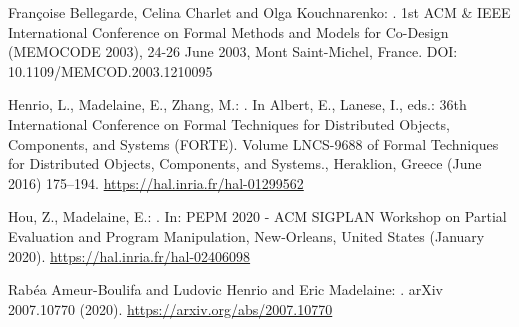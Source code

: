 \documentclass[11pt,fleqn]{article}
\begin{document}
\begin{thebibliography}{9}

Fran{\c{c}}oise Bellegarde, Celina Charlet and Olga Kouchnarenko:
.
\newblock 1st {ACM} {\&} {IEEE} International Conference on Formal Methods and Models for Co-Design {(MEMOCODE} 2003), 24-26 June 2003, Mont Saint-Michel, France. 
\newblock DOI: 10.1109/MEMCOD.2003.1210095

Henrio, L., Madelaine, E., Zhang, M.:
.
\newblock In Albert, E., Lanese, I., eds.: {36th International Conference on
  Formal Techniques for Distributed Objects, Components, and Systems (FORTE)}.
  Volume LNCS-9688 of Formal Techniques for Distributed Objects, Components,
  and Systems., Heraklion, Greece (June 2016)  175--194. 
\newblock  \url{https://hal.inria.fr/hal-01299562}

Hou, Z., Madelaine, E.:
.
\newblock In: {PEPM 2020 - ACM SIGPLAN Workshop on Partial Evaluation and
  Program Manipulation}, New-Orleans, United States (January 2020). 
 \newblock \url{https://hal.inria.fr/hal-02406098}

Rabéa Ameur-Boulifa and Ludovic Henrio and Eric Madelaine:
.
\newblock arXiv {2007.10770} (2020).
 \newblock \url{https://arxiv.org/abs/2007.10770}
\end{thebibliography}
\end{document}
